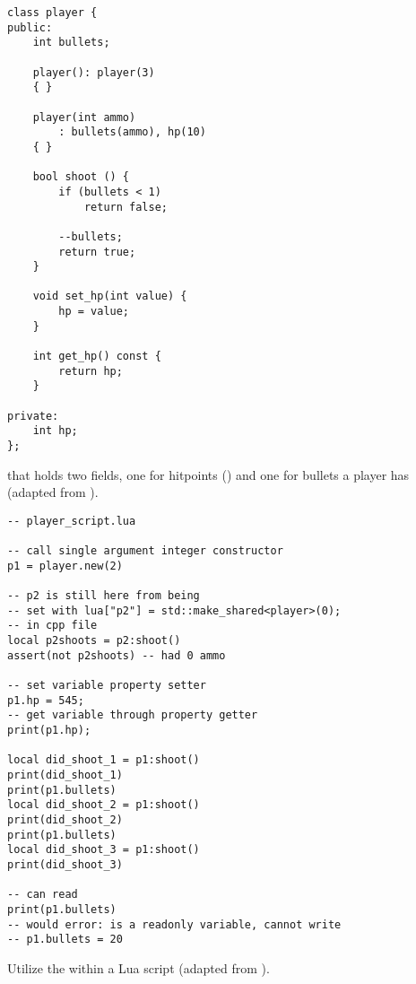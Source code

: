 \begin{listing}[hp]
\begin{verbatim}
class player {
public:
    int bullets;
    
    player(): player(3) 
    { }
    
    player(int ammo)
        : bullets(ammo), hp(10)
    { }
    
    bool shoot () {
        if (bullets < 1) 
            return false;
    
        --bullets;
        return true;
    }
    
    void set_hp(int value) {
        hp = value;
    }
    
    int get_hp() const {
        return hp;
    }
    
private:
    int hp;
};
\end{verbatim}
\caption{ that holds two fields, one for hitpoints () and one for bullets a player has (adapted from \cite{GitHub:ThePhD:sol2:cxx-in-lua}).}
\label{lst:lua:sol2-example:player}
\end{listing}

\begin{listing}[hp]
\begin{verbatim}
-- player_script.lua

-- call single argument integer constructor
p1 = player.new(2)

-- p2 is still here from being
-- set with lua["p2"] = std::make_shared<player>(0);
-- in cpp file
local p2shoots = p2:shoot()
assert(not p2shoots) -- had 0 ammo

-- set variable property setter
p1.hp = 545;
-- get variable through property getter
print(p1.hp);

local did_shoot_1 = p1:shoot()
print(did_shoot_1)
print(p1.bullets)
local did_shoot_2 = p1:shoot()
print(did_shoot_2)
print(p1.bullets)
local did_shoot_3 = p1:shoot()
print(did_shoot_3)

-- can read
print(p1.bullets)
-- would error: is a readonly variable, cannot write
-- p1.bullets = 20
\end{verbatim}
\caption{Utilize the  within a Lua script (adapted from \cite{GitHub:ThePhD:sol2:cxx-in-lua}).}
\label{lst:lua:sol2-example:usage}
\end{listing}

